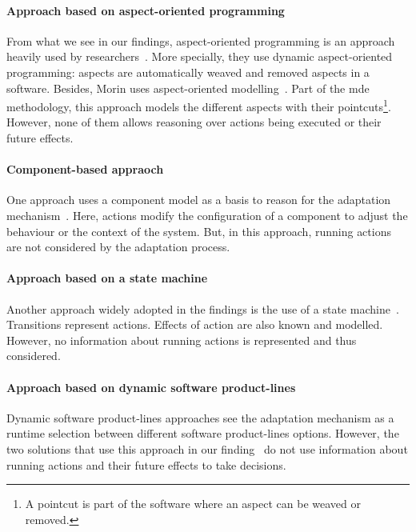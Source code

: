 \paragraph{Approach based on aspect-oriented programming}
From what we see in our findings, aspect-oriented programming is an approach heavily used by researchers~\cite{DBLP:journals/taosd/GreenwoodB06, DBLP:conf/soco/DavidL06, DBLP:conf/icws/CharfiDM09, DBLP:journals/scp/ParraBCD11, DBLP:conf/ewsa/FalcarinA04, DBLP:conf/gpce/PintoFT03}.
More specially, they use dynamic aspect-oriented programming: aspects are automatically weaved and removed aspects in a software.
Besides, Morin \etal uses aspect-oriented modelling~\cite{DBLP:conf/icse/MorinBNJ09}.
Part of the \gls{mde} methodology, this approach models the different aspects with their pointcuts\footnote{A pointcut is part of the software where an aspect can be weaved or removed.}.
However, none of them allows reasoning over \glspl{action} being executed or their future effects.
	
\paragraph{Component-based appraoch}
One approach uses a component model as a basis to reason for the adaptation mechanism~\cite{DBLP:conf/soco/DavidL06}.
Here, \glspl{action} modify the configuration of a component to adjust the behaviour or the context of the system.
But, in this approach, running \glspl{action} are not considered by the adaptation process.

\paragraph{Approach based on a state machine}
Another approach widely adopted in the findings is the use of a state machine~\cite{DBLP:conf/sigsoft/MorenoCGS15, DBLP:conf/kbse/FilieriGLM11,DBLP:conf/wetice/DjoudiBZ14, DBLP:conf/aosd/ZhangGC09, DBLP:conf/icse/GhezziPST13, DBLP:conf/kbse/TajalliGEM10}.
Transitions represent \glspl{action}.
Effects of action are also known and modelled.
However, no information about running \glspl{action} is represented and thus considered.

\paragraph{Approach based on dynamic software product-lines}
Dynamic software product-lines approaches see the adaptation mechanism as a runtime selection between different software product-lines options.
However, the two solutions that use this approach in our finding~\cite{DBLP:conf/dagstuhl/GhezziS10, DBLP:series/lncs/CordyCHLS13} do not use information about running \glspl{action} and their future effects to take decisions.  

